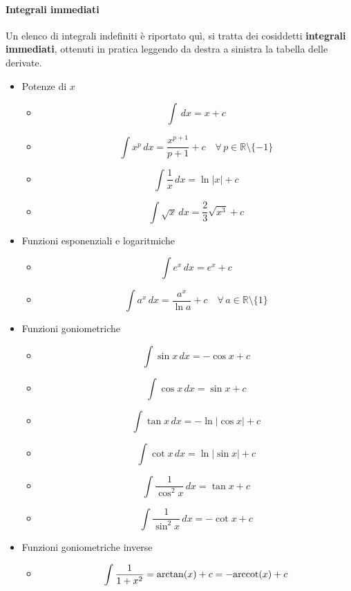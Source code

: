 \documentclass{article}
\theoremstyle{plain}
\theoremstyle{definition}
\theoremstyle{remark}
\begin{document}
\paragraph{Integrali immediati}
Un elenco di integrali indefiniti è riportato quì, si tratta dei cosiddetti \textbf{integrali immediati}, ottenuti in pratica leggendo da destra a sinistra la tabella delle derivate.
\begin{multicols}{2}
	\begin{itemize}        
        \item Potenze di $x$
        \begin{itemize}
            \item[] \[\int \,dx = x+c\]
            \item[] \[\int x^p \,dx = \dfrac{x^{p+1}}{p+1} +c	\quad\forall\,p\in\mathbb{R}\setminus\{-1\}\]
            \item[] \[\int \dfrac{1}{x} \,dx = \ln|x| +c\]
            \item[] \[\int \sqrt{x} \,dx = \dfrac{2}{3}\sqrt{x^3} +c\]
        \end{itemize}
        \item Funzioni esponenziali e logaritmiche
        \begin{itemize}
            \item[] \[\int e^x \,dx = e^x +c\]
            \item[] \[\int a^x \,dx = \dfrac{a^x}{\ln a} +c \quad\forall\,a\in\mathbb{R}\setminus\{1\}\]
        \end{itemize}
        \item Funzioni goniometriche
        \begin{itemize}
            \item[] \[\int \sin x \,dx = -\cos x +c\]
            \item[] \[\int \cos x \,dx = \sin x +c\]
            \item[] \[\int \tan x \,dx = -\ln|\cos x| +c\]
            \item[] \[\int \cot x \,dx = \ln|\sin x| +c\]
            \item[] \[\int \dfrac{1}{\cos^2x} \,dx = \tan x +c\]
		  \item[] \[\int \dfrac{1}{\sin^2x} \,dx = -\cot x +c\]
        \end{itemize}
        \item Funzioni goniometriche inverse
        \begin{itemize}
            \item[] \[\int \dfrac{1}{1+x^2}=\arctan(x)+c=-\textup{arccot}(x)+c\]

\end{itemize}
\end{itemize}
\end{multicols}
\end{document}
